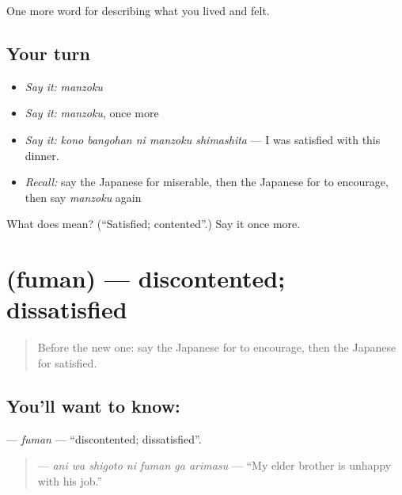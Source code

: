 \begin{grammarlens}[title={What you've built}]
One more word for describing what you lived and felt.
\end{grammarlens}

\subsection*{Your turn}
\begin{itemize}
\raggedright
  \item \emph{Say it:} \emph{manzoku}
  \item \emph{Say it:} \emph{manzoku}, once more
  \item \emph{Say it:} \emph{kono bangohan ni manzoku shimashita} — I was satisfied with this dinner.
  \item \emph{Recall:} say the Japanese for miserable, then the Japanese for to encourage, then say \emph{manzoku} again
\end{itemize}

\begin{tcolorbox}[breakable,colback=teal!4,colframe=teal!35!black,title={Before you move on}]
What does  mean? (\textquotedblleft{}Satisfied; contented\textquotedblright{}.) Say it once more.
\end{tcolorbox}
\section[\texorpdfstring{\ja{ふまん} (fuman)}{ふまん (fuman)}]{ (fuman) — discontented; dissatisfied}

\label{lesson:JA-C435-fuman}



\begin{quote}
Before the new one: say the Japanese for to encourage, then the Japanese for satisfied.
\end{quote}

\subsection*{You'll want to know: }
\textbf{} — \emph{fuman} — \textquotedblleft{}discontented; dissatisfied\textquotedblright{}.

\begin{quote}
\textbf{   } — \emph{ani wa shigoto ni fuman ga arimasu} — \textquotedblleft{}My elder brother is unhappy with his job.\textquotedblright{}
\end{quote}

